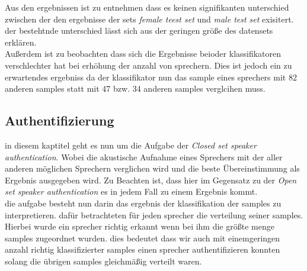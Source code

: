 \begin{table}[h]
\label{table:resultsClassifiers}
\end{table}

Aus den ergebnissen ist zu entnehmen dass es keinen signifikanten unterschied zwischen der den ergebnisse der sets \textit{female teest set} und \textit{male test set} exisitert. der bestehtnde unterschied lässt sich aus der geringen größe des datensets erklären.\\


Außerdem ist zu beobachten dass sich die Ergebnisse beioder klassifikatoren verschlechter hat bei erhöhung der anzahl von sprechern.
Dies ist jedoch ein zu erwartendes ergebniss da der klassifikator nun das sample eines sprechers mit 82 anderen samples statt mit 47 bzw. 34 anderen samples verglcihen muss.\\





\subsection{Authentifizierung}
\label{auth}

in diesem kaptitel geht es nun um die Aufgabe der \textit{Closed set speaker authentication}. Wobei die akustische Aufnahme eines Sprechers mit der aller anderen möglichen Sprechern verglichen wird und die beste Übereinstimmung als Ergebnis ausgegeben wird.\cite{beigi}
Zu Beachten ist, dass hier im Gegensatz zu der \textit{Open set speaker authentication} es in jedem Fall zu einem Ergebnis kommt. \\

die aufgabe besteht nun darin das ergebnis der klassifikation der samples zu interpretieren. 
dafür betrachteten für jeden sprecher die verteilung seiner samples.
Hierbei wurde ein sprecher richtig erkannt wenn bei ihm die größte menge samples zugeordnet wurden.
dies bedeutet dass wir auch mit einemgeringen anzahl richtig klassifizierter samples einen sprecher authentifizieren konnten solang die übrigen samples gleichmäßig verteilt waren. 

